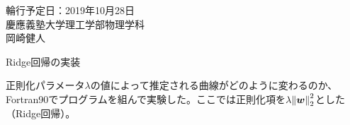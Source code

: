 \documentclass[dvipdfmx,autodetect-engine]{jsarticle}%
\begin{document}


\newcommand{\f}[2]{\frac{#1}{#2}}
\newcommand{\pd}[2]{\frac{\partial #1}{\partial#2}}
\newcommand{\D}[2]{\frac{ \mathrm{d} #1}{\mathrm{d}#2}}
\newcommand{\E}[1]{ \times 10^{#1}}
\newcommand{\un}[1]{~{\rm #1}}
\newcommand{\sub}[2]{#1_{\rm #2}}
\newcommand{\R}[1]{{\rm #1}}
\def\*{\times}
\newcommand{\dps}[1]{\displaystyle{#1}}
\newcommand{\rf}[1]{\ref{#1}}
\newcommand{\lb}[1]{\label{#1}}
\def\be{\begin{equation}}
\def\ee{\end{equation}}
\newcommand{\jp}[1]{\mbox{#1}}
\def\bea{\begin{eqnarray}}
\def\eea{\end{eqnarray}}
\def\bea*{\begin{eqnarray*}}
\def\eea*{\end{eqnarray*}}
\newcommand{\I}[4]{\int_{#1}^{#2} \, #3 \, {\rm d} #4}
\def\l{\left}
\def\r{\right}

\def\T{\mathsf{T}}




\begin{flushright}
輪行予定日：2019年10月28日
\\慶應義塾大学理工学部物理学科\\岡崎健人
\end{flushright}
\begin{center}
{\Large Ridge回帰の実装} 
\end{center}


正則化パラメータ$\lambda$の値によって推定される曲線がどのように変わるのか、Fortran90でプログラムを組んで実験した。ここでは正則化項を$\lambda \norm{\vb*{w}}_2^2$とした（Ridge回帰）。
\end{document}

